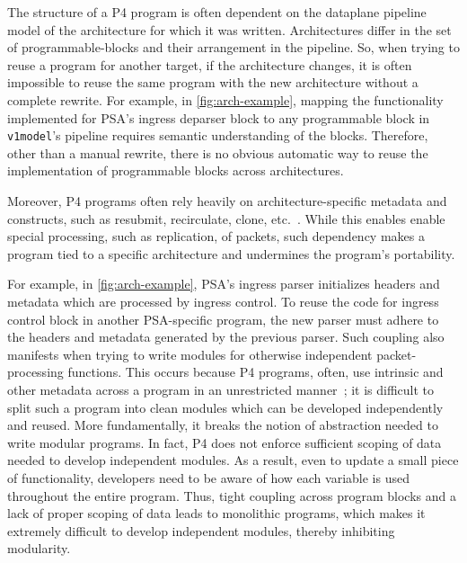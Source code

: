 \documentclass[letterpaper,twocolumn,10pt]{article}
\begin{document}
%
The structure of a P4 program is often dependent on the dataplane
pipeline model of the architecture for which it was written.
Architectures differ in the set of programmable-blocks and their
arrangement in the pipeline. So, when trying to reuse a program for
another target, if the architecture changes, it is often impossible to
reuse the same program with the new architecture without a complete
rewrite. For example, in \cref{fig:arch-example}, mapping the
functionality implemented for PSA's ingress deparser block to any
programmable block in \texttt{v1model}'s pipeline requires semantic
understanding of the blocks. Therefore, other than a manual rewrite,
there is no obvious automatic way to reuse the implementation of
programmable blocks across architectures.

Moreover, P4 programs often rely heavily on architecture-specific
metadata and constructs, such as resubmit, recirculate, clone,
etc.~\cite{simple_switch.md,psa}.  While this enables enable special
processing, such as replication, of packets, such dependency makes a
program tied to a specific architecture and undermines the program's
portability.

 For example, 
in
\cref{fig:arch-example}, PSA's ingress parser initializes headers and
metadata which are processed by ingress control. To reuse the code for
ingress control block in another PSA-specific program, the new parser
must adhere to the headers and metadata generated by the previous
parser. Such coupling also manifests when trying to write modules for
otherwise independent packet-processing functions. This occurs because
P4 programs, often, use intrinsic and other metadata across a program
in an unrestricted manner~\cite{switch.p4}; it is difficult to split
such a program into clean modules which can be developed independently
and reused. More fundamentally, it breaks the notion of abstraction
needed to write modular programs. In fact, P4 does not enforce
sufficient scoping of data needed to develop independent modules. As a
result, even to update a small piece of functionality, developers need
to be aware of how each variable is used throughout the entire
program. Thus, tight coupling across program blocks and a lack of
proper scoping of data leads to monolithic programs, which makes it
extremely difficult to develop independent modules, thereby inhibiting
modularity.
\end{document}
